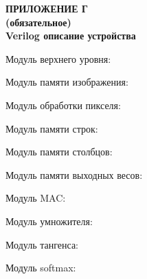 \clearpage
{}%
\par

\normalsize
\begin{center}
  \textbf{ПРИЛОЖЕНИЕ Г} \\
  \textbf{(обязательное)} \\
  \textbf{Verilog описание устройства}
\end{center}

Модуль верхнего уровня:



Модуль памяти изображения:



Модуль обработки пикселя:




Модуль памяти строк:



Модуль памяти столбцов:



Модуль памяти выходных весов:



Модуль MAC:\@



Модуль умножителя:





Модуль тангенса:



Модуль softmax:



\pdfpagewidth=210mm
\pdfpageheight=297mm

